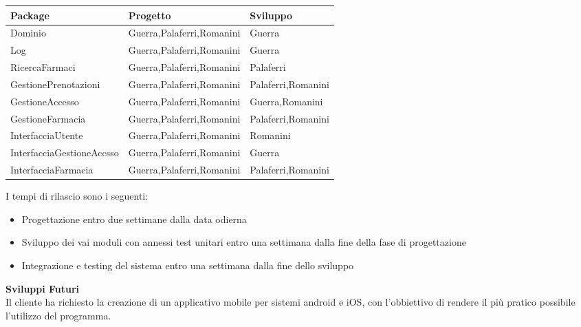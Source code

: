 \begin{tabular} {|P{5cm}|P{5cm}|P{5cm}|} %
    \hline
    \textbf{Package}          & \textbf{Progetto}         & \textbf{Sviluppo}  \\
    \hline
    Dominio                   & Guerra,Palaferri,Romanini & Guerra             \\
    \hline
    Log                       & Guerra,Palaferri,Romanini & Guerra             \\
    \hline
    RicercaFarmaci            & Guerra,Palaferri,Romanini & Palaferri          \\
    \hline
    GestionePrenotazioni      & Guerra,Palaferri,Romanini & Palaferri,Romanini \\
    \hline
    GestioneAccesso           & Guerra,Palaferri,Romanini & Guerra,Romanini    \\
    \hline
    GestioneFarmacia          & Guerra,Palaferri,Romanini & Palaferri,Romanini \\
    \hline
    InterfacciaUtente         & Guerra,Palaferri,Romanini & Romanini           \\
    \hline
    InterfacciaGestioneAccsso & Guerra,Palaferri,Romanini & Guerra             \\
    \hline
    InterfacciaFarmacia       & Guerra,Palaferri,Romanini & Palaferri,Romanini \\
    \hline
\end{tabular}
\hfill \break

I tempi di rilascio sono i seguenti:
\begin{itemize}
    \item Progettazione entro due settimane dalla data odierna
    \item Sviluppo dei vai moduli con annessi test unitari entro una settimana dalla fine della fase di progettazione
    \item Integrazione e testing del sistema entro una settimana dalla fine dello sviluppo
\end{itemize}
\hfill \break

\textbf{Sviluppi Futuri}
\\

Il cliente ha richiesto la creazione di un applicativo mobile per sistemi
android e iOS, con l'obbiettivo di rendere il più pratico possibile l'utilizzo
del programma.
